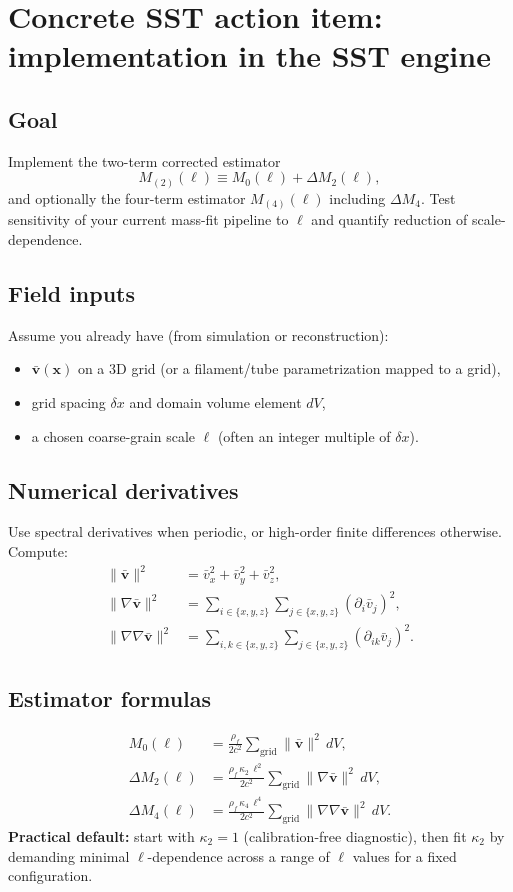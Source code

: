 \documentclass[11pt]{article}
\newcommand{\rhoF}{\rho_{\!f}}
\begin{document}
\section{Concrete SST action item: implementation in the SST engine}
\subsection*{Goal}
Implement the two-term corrected estimator
\begin{equation}
M_{(2)}(\ell) \equiv M_0(\ell)+\Delta M_2(\ell),
\end{equation}
and optionally the four-term estimator $M_{(4)}(\ell)$ including $\Delta M_4$. Test sensitivity of your current mass-fit pipeline to $\ell$ and quantify reduction of scale-dependence.

\subsection*{Field inputs}
Assume you already have (from simulation or reconstruction):
\begin{itemize}
\item $\bar{\mathbf{v}}(\mathbf{x})$ on a 3D grid (or a filament/tube parametrization mapped to a grid),
\item grid spacing $\delta x$ and domain volume element $dV$,
\item a chosen coarse-grain scale $\ell$ (often an integer multiple of $\delta x$).
\end{itemize}

\subsection*{Numerical derivatives}
Use spectral derivatives when periodic, or high-order finite differences otherwise. Compute:
\begin{align}
\lVert \bar{\mathbf{v}}\rVert^2 &= \bar v_x^2+\bar v_y^2+\bar v_z^2,\\
\lVert \nabla \bar{\mathbf{v}}\rVert^2 &= \sum_{i\in\{x,y,z\}}\sum_{j\in\{x,y,z\}} (\partial_i \bar v_j)^2,\\
\lVert \nabla\nabla \bar{\mathbf{v}}\rVert^2 &= \sum_{i,k\in\{x,y,z\}}\sum_{j\in\{x,y,z\}} (\partial_{ik}\bar v_j)^2.
\end{align}

\subsection*{Estimator formulas}
\begin{align}
M_0(\ell) &= \frac{\rhoF}{2c^2}\sum_{\text{grid}} \lVert \bar{\mathbf{v}}\rVert^2\,dV,\\
\Delta M_2(\ell) &= \frac{\rhoF\,\kappa_2\,\ell^2}{2c^2}\sum_{\text{grid}} \lVert \nabla \bar{\mathbf{v}}\rVert^2\,dV,\\
\Delta M_4(\ell) &= \frac{\rhoF\,\kappa_4\,\ell^4}{2c^2}\sum_{\text{grid}} \lVert \nabla\nabla \bar{\mathbf{v}}\rVert^2\,dV.
\end{align}
\textbf{Practical default:} start with $\kappa_2=1$ (calibration-free diagnostic), then fit $\kappa_2$ by demanding minimal $\ell$-dependence across a range of $\ell$ values for a fixed configuration.
\end{document}
